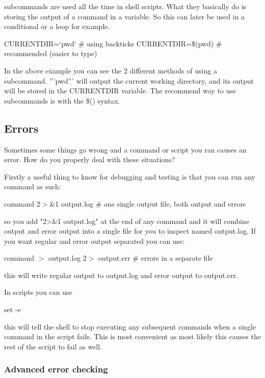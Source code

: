 subcommands are used all the time in shell scripts. What they basically do is
storing the output of a command in a variable. So this can later be used in a
conditional or a loop for example.

\begin{prompt}
  CURRENTDIR=`pwd`  # using backticks
  CURRENTDIR=\$(pwd)  # recommended (easier to type)
\end{prompt}

In the above example you can see the 2 different methods of using a subcommand.
'''pwd''' will output the current working directory, and its output will be
stored in the CURRENTDIR variable.  The recommend way to use subcommands is with
the \$() syntax.

\subsection{Errors}

Sometimes some things go wrong and a command or script you ran causes an error.
How do you properly deal with these situations?

Firstly a useful thing to know for debugging and testing is that you can run any
command as such:

\begin{prompt}
command 2$>$&1 output.log   # one single output file, both output and errors
\end{prompt}

so you add "2>\&1 output.log" at the end of any command and it will combine
output and error output into a single file for you to inspect named output.log.
If you want regular and error output separated you can use:

\begin{prompt}
command $>$ output.log 2$>$ output.err  # errors in a separate file
\end{prompt}

this will write regular output to output.log and error output to output.err.

In scripts you can use

\begin{prompt}
set -e
\end{prompt}

this will tell the shell to stop executing any subsequent commands when a single
command in the script fails. This is most convenient as most likely this causes
the rest of the script to fail as well.

\subsubsection{Advanced error checking}


